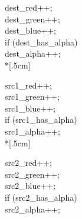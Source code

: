 \documentclass{foils}
\begin{document}
{\begin{flushleft}
dest\_red++;\\
dest\_green++;\\
dest\_blue++;\\
if (dest\_has\_alpha)\\
\hspace*{.4cm} dest\_alpha++;\\*[.5cm]

src1\_red++;\\
src1\_green++;\\
src1\_blue++;\\
if (src1\_has\_alpha)\\
\hspace*{.4cm} src1\_alpha++;\\*[.5cm]

src2\_red++;\\
src2\_green++;\\
src2\_blue++;\\
if (src2\_has\_alpha)\\
\hspace*{.4cm} src2\_alpha++;
\end{flushleft} 

}
\end{document}
